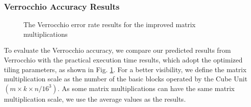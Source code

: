 \subsubsection{Verrocchio Accuracy Results}

\begin{figure}[tbp]
\captionsetup{justification=centering}
\caption{The Verrocchio error rate results for the improved matrix multiplications}
\label{fig:sim}
\end{figure}

To evaluate the Verrocchio accuracy, we compare our predicted results from Verrocchio with the practical execution time results, which adopt the optimized tiling parameters, as shown in Fig. \ref{fig:sim}. For a better visibility, we define the matrix multiplication scale as the number of the basic blocks operated by the Cube Unit $(m \times k \times n / 16 ^ 3)$. As some matrix multiplications can have the same matrix multiplication scale, we use the average values as the results.

